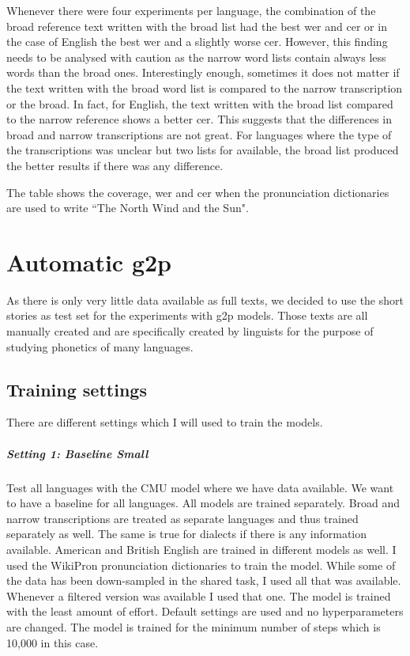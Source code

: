 Whenever there were four experiments per language, the combination of the broad reference text written with the broad list had the best \ac{wer} and \ac{cer} or in the case of English the best \ac{wer} and a slightly worse \ac{cer}. However, this finding needs to be analysed with caution as the narrow word lists contain always less words than the broad ones. Interestingly enough, sometimes it does not matter if the text written with the broad word list is compared to the narrow transcription or the broad. In fact, for English, the text written with the broad list compared to the narrow reference shows a better \ac{cer}. This suggests that the differences in broad and narrow transcriptions are not great.
For languages where the type of the transcriptions was unclear but two lists for available, the broad list produced the better results if there was any difference. 



\begin{table}[h!]
\begin{center}
\caption[Coverage of Pronunciation Dictionaries]{The table shows the coverage, \ac{wer} and \ac{cer} when the pronunciation dictionaries are used to write ``The North Wind and the Sun".}
\label{tab:coverage}
\end{center}
\end{table}

\section{Automatic \ac{g2p}}
As there is only very little data available as full texts, we decided to use the short stories as test set for the experiments with \ac{g2p} models. Those texts are all manually created and are specifically created by linguists for the purpose of studying phonetics of many languages. 

\subsection{Training settings}
There are different settings which I will used to train the models.

\subparagraph{Setting 1: Baseline Small}
Test all languages with the CMU model where we have data available. We want to have a baseline for all languages. All models are trained separately. Broad and narrow transcriptions are treated as separate languages and thus trained separately as well. The same is true for dialects if there is any information available. American and British English are trained in different models as well. I used the WikiPron pronunciation dictionaries to train the model. While some of the data has been down-sampled in the shared task, I used all that was available. Whenever a filtered version was available I used that one. The model is trained with the least amount of effort. Default settings are used and no hyperparameters are changed. The model is trained for the minimum number of steps which is 10,000 in this case. 

